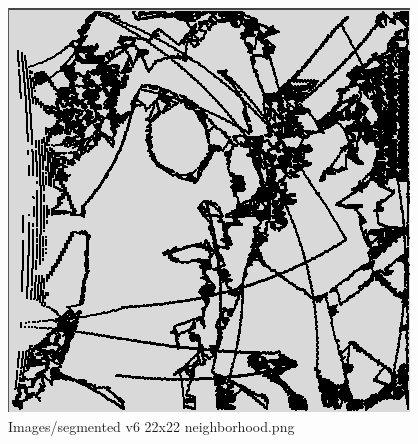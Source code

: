 \begin{figure}[H]
\includegraphics[width=\textwidth]{Images/segmented_v6_22x22_neighborhood.png}
\caption{Images/segmented v6 22x22 neighborhood.png}
\label{fig:Images/segmented v6 22x22 neighborhood.png}
\end{figure}
